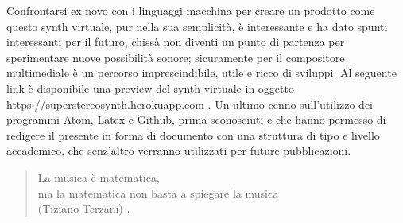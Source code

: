 \documentclass[
	a4paper,
	twocolumn
	]{article}
\begin{document}
Confrontarsi ex novo con i linguaggi macchina per creare un prodotto come questo
synth virtuale, pur nella sua semplicità, è interessante e ha dato spunti
interessanti per il futuro, chissà non diventi un punto di partenza per
sperimentare nuove possibilità sonore; sicuramente per il compositore
multimediale è un percorso imprescindibile, utile e ricco di sviluppi.
Al seguente link è disponibile una preview del synth virtuale in oggetto
https://superstereosynth.herokuapp.com .
Un ultimo cenno sull'utilizzo dei programmi Atom, Latex e Github, prima
sconosciuti e che hanno permesso di redigere il presente in forma di
documento con una struttura di tipo e livello accademico, che senz'altro
verranno utilizzati per future pubblicazioni.

\begin{quote}
La musica è matematica, \\
ma la matematica non basta a spiegare la musica \\
(Tiziano Terzani) \cite{tizterz}.
\end{quote}
%




\vfill\null

\raggedright


\end{document}
